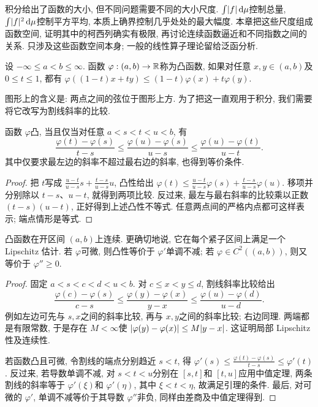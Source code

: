 \label{ra:c5:chapter}

积分给出了函数的大小, 但不同问题需要不同的大小尺度. $\int\lvert f\rvert\,\mathrm d\mu$控制总量, $\int\lvert f\rvert^2\,\mathrm d\mu$控制平方平均, 本质上确界控制几乎处处的最大幅度. 本章把这些尺度组成函数空间, 证明其中的柯西列确实有极限, 再讨论连续函数逼近和不同指数之间的关系. 只涉及这些函数空间本身; 一般的线性算子理论留给泛函分析.


\begin{definition}[凸函数]
设 $-\infty\le a<b\le\infty$. 函数 $\varphi:(a,b)\to\mathbb R$称为凸函数, 如果对任意 $x,y\in(a,b)$及 $0\le t\le1$, 都有 $\varphi((1-t)x+ty)\le(1-t)\varphi(x)+t\varphi(y)$.
\end{definition}

图形上的含义是: 两点之间的弦位于图形上方. 为了把这一直观用于积分, 我们需要将它改写为割线斜率的比较.

\begin{lemma}\label{ra:c5:convex-slopes}
函数 $\varphi$凸, 当且仅当对任意 $a<s<t<u<b$, 有
\[
 \frac{\varphi(t)-\varphi(s)}{t-s}
 \le \frac{\varphi(u)-\varphi(s)}{u-s}
 \le \frac{\varphi(u)-\varphi(t)}{u-t}.
\]
其中仅要求最左边的斜率不超过最右边的斜率, 也得到等价条件.
\end{lemma}
\begin{proof}
把 $t$写成 $\frac{u-t}{u-s}s+\frac{t-s}{u-s}u$, 凸性给出 $\varphi(t)\le\frac{u-t}{u-s}\varphi(s)+\frac{t-s}{u-s}\varphi(u)$. 移项并分别除以 $t-s$、$u-t$, 就得到两项比较. 反过来, 最左与最右斜率的比较乘以正数 $(t-s)(u-t)$, 正好得到上述凸性不等式. 任意两点间的严格内点都可这样表示; 端点情形是等式.
\end{proof}

\begin{proposition}\label{ra:c5:convex-continuity}
凸函数在开区间 $(a,b)$上连续. 更确切地说, 它在每个紧子区间上满足一个 Lipschitz 估计. 若 $\varphi$可微, 则凸性等价于 $\varphi'$单调不减; 若 $\varphi\in C^2((a,b))$, 则又等价于 $\varphi''\ge0$.
\end{proposition}
\begin{proof}
固定 $a<s<c<d<u<b$. 对 $c\le x<y\le d$, 割线斜率比较给出
\[
 \frac{\varphi(c)-\varphi(s)}{c-s}
 \le\frac{\varphi(y)-\varphi(x)}{y-x}
 \le\frac{\varphi(u)-\varphi(d)}{u-d}.
\]
例如左边可先与 $s,x$之间的斜率比较, 再与 $x,y$之间的斜率比较; 右边同理. 两端都是有限常数, 于是存在 $M<\infty$使 $\lvert \varphi(y)-\varphi(x)\rvert\le M\lvert y-x\rvert$. 这证明局部 Lipschitz 性及连续性.

若函数凸且可微, 令割线的端点分别趋近 $s<t$, 得 $\varphi'(s)\le\frac{\varphi(t)-\varphi(s)}{t-s}\le\varphi'(t)$. 反过来, 若导数单调不减, 对 $s<t<u$分别在 $[s,t]$和 $[t,u]$应用中值定理, 两条割线的斜率等于 $\varphi'(\xi)$和 $\varphi'(\eta)$, 其中 $\xi<t<\eta$, 故满足引理的条件. 最后, 对可微的 $\varphi'$, 单调不减等价于其导数 $\varphi''$非负, 同样由差商及中值定理得到.
\end{proof}


